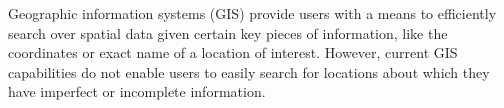 

Geographic information systems (GIS) provide users with a means to efficiently search over spatial data given certain key pieces of information, like the coordinates or exact name of a location of interest. However, current GIS capabilities do not enable users to easily search for locations about which they have imperfect or incomplete information. 


